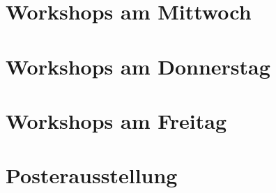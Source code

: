 \documentclass[
version=last,
toc=bib,
toc=graduated,
toc=index,
toc=listof,
fontsize=9pt,
parskip=false,
openany]{scrbook}
\begin{document}



 
\pagestyle{cropmarksstyle}
\begin{titlepage}
  \thispagestyle{page-title}
  \null
\end{titlepage}
\pagestyle{cropmarksstyle}




\clearpage
%
\section*{Workshops am Mittwoch}\label{mittwoch-workshops}

\newpage
\section*{Workshops am Donnerstag}\label{donnerstag-workshops}

\newpage
\section*{Workshops am Freitag}\label{freitag-workshops}



\clearpage


\clearpage


\clearpage
\section*{Posterausstellung}\label{donnerstag-poster}
\renewcommand{\conferenceDay}{\posterausstellung}
\setPageBackground




%

\end{document}
